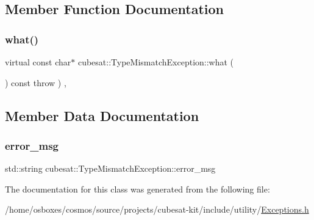 \subsection{Member Function Documentation}
\mbox{\label{classcubesat_1_1TypeMismatchException_aa4af5e59a7722f33a47bd91b6377da64}} 
\subsubsection{\texorpdfstring{what()}{what()}}
{\footnotesize\ttfamily virtual const char$\ast$ cubesat\+::\+Type\+Mismatch\+Exception\+::what (\begin{DoxyParamCaption}{ }\end{DoxyParamCaption}) const throw  ) \hspace{0.3cm}{\ttfamily [inline]}, {\ttfamily [virtual]}}



\subsection{Member Data Documentation}
\mbox{\label{classcubesat_1_1TypeMismatchException_a13bdeeacfdf75a481bc1071084c1cf6d}} 
\subsubsection{\texorpdfstring{error\+\_\+msg}{error\_msg}}
{\footnotesize\ttfamily std\+::string cubesat\+::\+Type\+Mismatch\+Exception\+::error\+\_\+msg\hspace{0.3cm}{\ttfamily [private]}}



The documentation for this class was generated from the following file\+:\begin{DoxyCompactItemize}
\item 
/home/osboxes/cosmos/source/projects/cubesat-\/kit/include/utility/\hyperlink{Exceptions_8h}{Exceptions.\+h}\end{DoxyCompactItemize}
